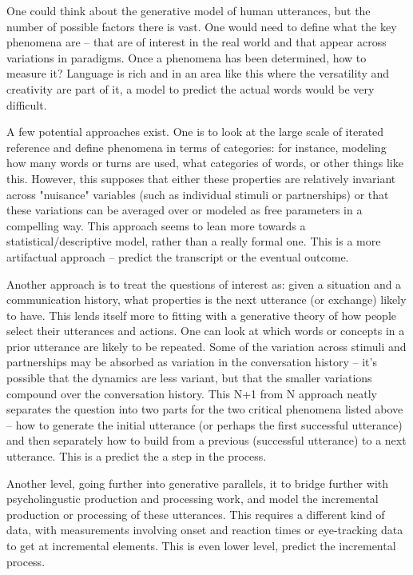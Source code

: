\documentclass[]{article}
\begin{document}
	One could think about the generative model of human utterances, but the number of possible factors there is vast. One would need to define what the key phenomena are -- that are of interest in the real world and that appear across variations in paradigms. Once a phenomena has been determined, how to measure it? Language is rich and in an area like this where the versatility and creativity are part of it, a model to predict the actual words would be very difficult. 
	
	A few potential approaches exist. One is to look at the large scale of iterated reference and define phenomena in terms of categories: for instance, modeling how many words or turns are used, what categories of words, or other things like this. However, this supposes that either these properties are relatively invariant across "nuisance" variables (such as individual stimuli or partnerships) or that these variations can be averaged over or modeled as free parameters in a compelling way. This approach seems to lean more towards a statistical/descriptive model, rather than a really formal one. This is a more artifactual approach -- predict the transcript or the eventual outcome. 
	
	Another approach is to treat the questions of interest as: given a situation and a communication history, what properties is the next utterance (or exchange) likely to have. This lends itself more to fitting with a generative theory of how people select their utterances and actions. One can look at which words or concepts in a prior utterance are likely to be repeated. Some of the variation across stimuli and partnerships may be absorbed as variation in the conversation history -- it's possible that the dynamics are less variant, but that the smaller variations compound over the conversation history. 
	This N+1 from N approach neatly separates the question into two parts for the two critical phenomena listed above -- how to generate the initial utterance (or perhaps the first successful utterance) and then separately how to build from a previous (successful utterance) to a next utterance. This is a predict the a step in the process. 
	
	Another level, going further into generative parallels, it to bridge further with psycholingustic production and processing work, and model the incremental production or processing of these utterances. This requires a different kind of data, with measurements involving onset and reaction times or eye-tracking data to get at incremental elements. This is even lower level, predict the incremental process. 
	
\end{document}
